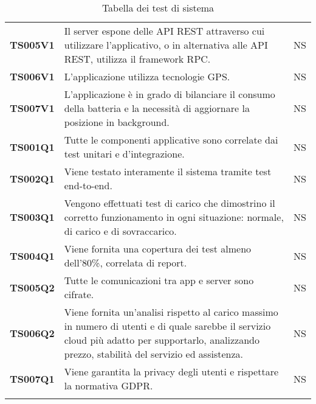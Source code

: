 \documentclass[../piano-di-qualifica.tex]{subfiles}
\begin{document}
\begin{centering}
\begin{longtable}[H]{>{\centering\bfseries}m{3cm} >{}p{10cm} >{\centering\arraybackslash}m{3cm}}
        TS005V1 & Il server espone delle API REST attraverso cui utilizzare l’applicativo, o in alternativa alle API REST, utilizza il framework RPC\@. \newline
                & NS \\

        TS006V1 & L’applicazione utilizza tecnologie GPS\@. \newline
                & NS \\

        TS007V1 & L’applicazione è in grado di bilanciare il consumo della batteria e la necessità di aggiornare la posizione in background. \newline
                & NS \\

        TS001Q1 & Tutte le componenti applicative sono correlate dai test unitari e d’integrazione. \newline
                & NS \\

        TS002Q1 & Viene testato interamente il sistema tramite test end-to-end. \newline
                & NS \\

        TS003Q1 & Vengono effettuati test di carico che dimostrino il corretto funzionamento in ogni situazione: normale, di carico e di sovraccarico. \newline
                & NS \\

        TS004Q1 & Viene fornita una copertura dei test almeno dell’80\%, correlata di report. \newline
                & NS \\

        TS005Q2 & Tutte le comunicazioni tra app e server sono cifrate. \newline
                & NS \\

        TS006Q2 & Viene fornita un’analisi rispetto al carico massimo in numero di utenti e di quale sarebbe il servizio cloud più adatto per supportarlo, analizzando prezzo, stabilità del servizio ed assistenza. \newline
                & NS \\

        TS007Q1 & Viene garantita la privacy degli utenti e rispettare la normativa GDPR\@. \newline
                & NS \\

        \rowcolor{white}
        \caption{Tabella dei test di sistema}%
        \label{tab:test_sistema}
      \end{longtable}
    \end{centering}
\end{document}
